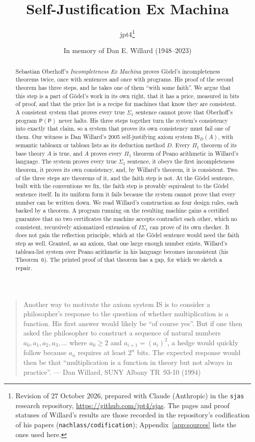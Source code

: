 \documentclass[11pt]{article}
\title{Self-Justification Ex Machina}
\author{jpt4\thanks{Revision of 27 October 2026, prepared with Claude
  (Anthropic) in the \texttt{sjas} research repository,
  \url{https://github.com/jpt4/sjas}. The pages and proof statuses of
  Willard's results are those recorded in the repository's codification of
  his papers (\texttt{nachlass/codification}); Appendix~\ref{app:sources}
  lists the ones used here.}}
\date{In memory of Dan E. Willard (1948--2023)}
\theoremstyle{plain}
\theoremstyle{definition}
\begin{document}
\maketitle

\begin{abstract}
\noindent
Sebastian Oberhoff's \emph{Incompleteness Ex Machina} proves Gödel's
incompleteness theorems twice, once with sentences and once with programs.
His proof of the second theorem has three steps, and he takes one of them
``with some faith''. We argue that this step is a part of Gödel's work in its
own right, that it has a price, measured in bits of proof, and that the price
list is a recipe for machines that know they are consistent. A consistent
system that proves every true $\Sigma_1$ sentence cannot prove that
Oberhoff's program $\mathsf{P}(\mathsf{P})$ never halts. His three steps
together turn the system's consistency into exactly that claim, so a system
that proves its own consistency must fail one of them. Our witness is Dan
Willard's 2005
self-justifying axiom system $\mathrm{IS}_D(A)$, with semantic tableaux or
tableau lists as its deduction method $D$. Every $\Pi_1$ theorem of its base
theory $A$ is true, and $A$ proves every $\Pi_1$ theorem of Peano arithmetic
in Willard's language. The system proves every true $\Sigma_1$ sentence, it
obeys the first incompleteness theorem, it proves its own consistency, and,
by Willard's theorem, it is consistent. Two of the three steps are theorems
of it, and the faith step is not. At the Gödel sentence, built with the
conventions we fix, the faith step is provably equivalent to the Gödel
sentence itself. In its uniform form it fails because the system cannot
prove that every number can be written down. We read Willard's construction
as four design rules, each backed by a theorem. A program running on the
resulting machine gains a certified guarantee that no two certificates the
machine accepts contradict each other, which no consistent, recursively
axiomatized extension of $I\Sigma_1$ can prove of its own checker. It does
not gain the reflection principle, which at the Gödel sentence would need
the faith step as well. Granted, as an axiom, that one large enough
number exists, Willard's tableau-list system over Peano arithmetic in his
language becomes inconsistent (his Theorem~6). The printed proof of that
theorem has a gap, for which we sketch a repair.
\end{abstract}

\begin{quote}\small
Another way to motivate the axiom system IS is to consider a philosopher's
response to the question of whether multiplication is a function. His first
answer would likely be ``of course yes''. But if one then asked the
philosopher to construct a sequence of natural numbers
$a_0, a_1, a_2, a_3, \ldots$ where $a_0 \ge 2$ and $a_{i+1} = (a_i)^2$, a hedge
would quickly follow because $a_n$ requires at least $2^n$ bits. The expected
response would then be that ``multiplication is a function in theory but not
always in practice''.
\hfill --- Dan Willard, SUNY Albany TR~93-10 (1994)
\end{quote}
\end{document}
